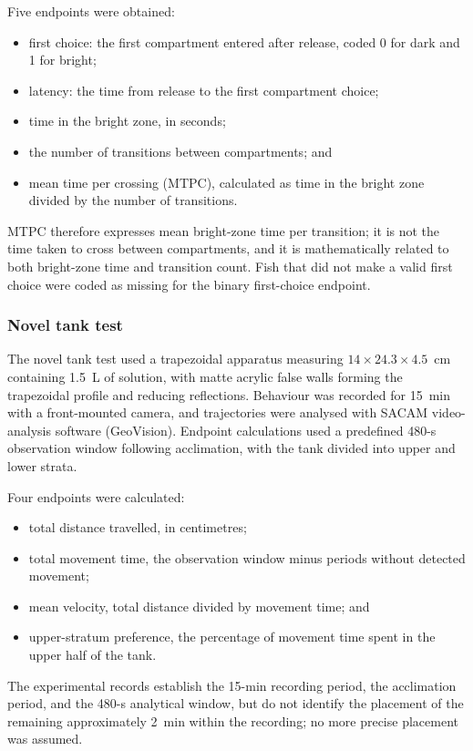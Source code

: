 \documentclass[12pt,a4paper]{article}
\begin{document}
Five endpoints were obtained:
\begin{itemize}
    \item first choice: the first compartment entered after release, coded 0 for dark and 1 for bright;
    \item latency: the time from release to the first compartment choice;
    \item time in the bright zone, in seconds;
    \item the number of transitions between compartments; and
    \item mean time per crossing (MTPC), calculated as time in the bright zone divided by the number of transitions.
\end{itemize}
MTPC therefore expresses mean bright-zone time per transition; it is not the time taken to cross between compartments, and it is mathematically related to both bright-zone time and transition count. Fish that did not make a valid first choice were coded as missing for the binary first-choice endpoint.

\subsubsection{Novel tank test}
\label{sec:ntt}
The novel tank test used a trapezoidal apparatus measuring $14 \times 24.3 \times 4.5$~cm containing 1.5~L of solution, with matte acrylic false walls forming the trapezoidal profile and reducing reflections. Behaviour was recorded for 15~min with a front-mounted camera, and trajectories were analysed with SACAM video-analysis software (GeoVision). Endpoint calculations used a predefined 480-s observation window following acclimation, with the tank divided into upper and lower strata.

Four endpoints were calculated:
\begin{itemize}
    \item total distance travelled, in centimetres;
    \item total movement time, the observation window minus periods without detected movement;
    \item mean velocity, total distance divided by movement time; and
    \item upper-stratum preference, the percentage of movement time spent in the upper half of the tank.
\end{itemize}
The experimental records establish the 15-min recording period, the acclimation period, and the 480-s analytical window, but do not identify the placement of the remaining approximately 2~min within the recording; no more precise placement was assumed.
\end{document}
